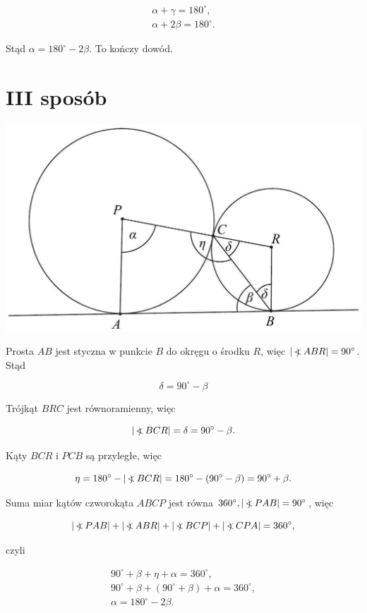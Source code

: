 \documentclass[10pt]{article}
\newcommand\Varangle{\mathop{{<\!\!\!\!\!\text{\small)}}\:}\nolimits}
\begin{document}
$$
\begin{gathered}
\alpha+\gamma=180^{\circ}, \\
\alpha+2 \beta=180^{\circ} .
\end{gathered}
$$

Stąd $\alpha=180^{\circ}-2 \beta$. To kończy dowód.

\section*{III sposób}
\begin{center}
\includegraphics[max width=\textwidth]{2025_02_07_e35f706dbfcfb4be75cfg-10(1)}
\end{center}

Prosta $A B$ jest styczna w punkcie $B$ do okręgu o środku $R$, więc $|\Varangle A B R|=90^{\circ}$. Stąd

$$
\delta=90^{\circ}-\beta
$$

Trójkąt $B R C$ jest równoramienny, więc

$$
|\Varangle B C R|=\delta=90^{\circ}-\beta .
$$

Kąty $B C R$ i $P C B$ są przyległe, więc

$$
\eta=180^{\circ}-|\Varangle B C R|=180^{\circ}-\left(90^{\circ}-\beta\right)=90^{\circ}+\beta .
$$

Suma miar kątów czworokąta $A B C P$ jest równa $360^{\circ},|\Varangle P A B|=90^{\circ}$, więc

$$
|\Varangle P A B|+|\Varangle A B R|+|\Varangle B C P|+|\Varangle C P A|=360^{\circ},
$$

czyli

$$
\begin{gathered}
90^{\circ}+\beta+\eta+\alpha=360^{\circ}, \\
90^{\circ}+\beta+\left(90^{\circ}+\beta\right)+\alpha=360^{\circ}, \\
\alpha=180^{\circ}-2 \beta .
\end{gathered}
$$
\end{document}
